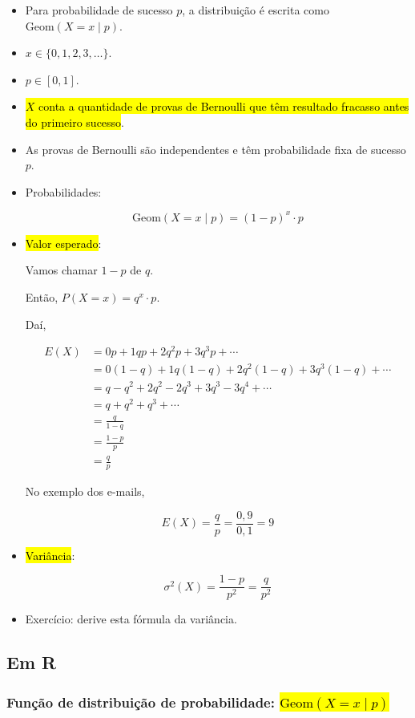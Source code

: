 \documentclass[
  11pt]{report}
\begin{document}
\begin{itemize}
\item
  Para probabilidade de sucesso $p$, a distribuição é escrita como $\text{Geom}(X=x \mid p)$.
\item
  $x \in \{0, 1, 2, 3, \ldots \}$.
\item
  $p \in [0, 1]$.
\item
  {\hl{$X$ conta a quantidade de provas de Bernoulli que têm resultado fracasso antes do primeiro sucesso}}.
\item
  As provas de Bernoulli são independentes e têm probabilidade fixa de sucesso $p$.
\item
  Probabilidades:

  \[
  \text{Geom}(X = x \mid p) = (1-p)^x \cdot p
  \]
\item
  {\hl{Valor esperado}}:

  Vamos chamar $1 - p$ de $q$.

  Então, $P(X = x) = q^x \cdot p$.

  Daí,

  \[
  \begin{aligned}
  E(X) &= 0p + 1qp + 2q^2p + 3q^3p + \cdots \\
       &= 0(1-q) + 1q(1-q) + 2q^2(1-q) + 3q^3(1-q) + \cdots \\
       &= q - q^2 + 2q^2 - 2q^3 + 3q^3 - 3q^4 + \cdots \\
       &= q + q^2 + q^3 + \cdots \\
       &= \frac{q}{1-q} \\
       &= \frac{1-p}{p} \\
       &= \frac qp
  \end{aligned}
  \]

  No exemplo dos e-mails,

  \[
  E(X) = \frac{q}{p} = \frac{0{,}9}{0{,}1} = 9
  \]
\item
  {\hl{Variância}}:

  \[
  \sigma^2(X) = \frac{1-p}{p^2} = \frac q{p^2}
  \]
\item
  Exercício: derive esta fórmula da variância.
\end{itemize}

\hypertarget{em-r-2}{%
\subsection{Em R}\label{em-r-2}}

\hypertarget{funuxe7uxe3o-de-distribuiuxe7uxe3o-de-probabilidade-textgeomx-x-mid-p}{%
\subsubsection*{\texorpdfstring{Função de distribuição de probabilidade: {\hl{$\text{Geom}(X = x \mid p)$}}}{Função de distribuição de probabilidade: }}\label{funuxe7uxe3o-de-distribuiuxe7uxe3o-de-probabilidade-textgeomx-x-mid-p}}
\end{document}

